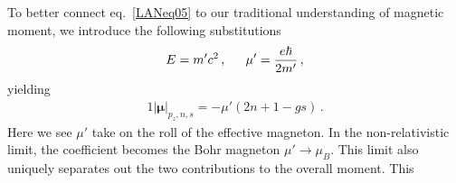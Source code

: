 \documentclass[
aps,
pra,
twocolumn,
showpacs,
preprintnumbers,
amsmath,
amssymb,
footinbib
]{revtex4-2}
\begin{document}
To better connect eq.~\eqref{LANeq05} to our traditional understanding of magnetic moment, we introduce the following substitutions
\begin{alignat}{1}
  \label{LANeq06} E = m'c^{2}\,,\indent \mu'=\frac{e\hbar}{2m'}\,,
\end{alignat}
yielding
\begin{alignat}{1}
  \label{LANeq07} \left|\boldsymbol{\mu}\right|_{p_{z},n,s}=-\mu'(2n+1-gs)\,.
\end{alignat}
Here we see $\mu'$ take on the roll of the effective magneton. In the non-relativistic limit, the coefficient becomes the Bohr magneton $\mu'\rightarrow\mu_{B}$. This limit also uniquely separates out the two contributions to the overall moment. This 
\end{document}
